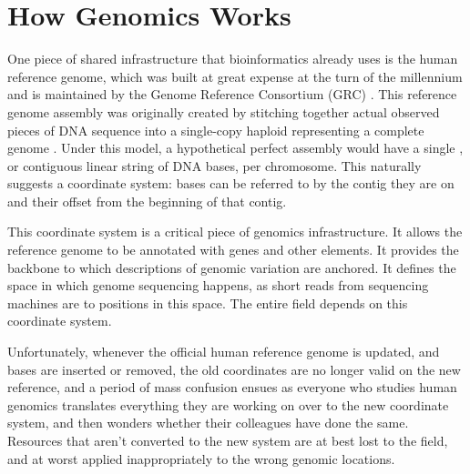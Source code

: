 \documentclass[11pt,proposal]{ucthesis}
\begin{document}
    
    
    
    
    

\section{How Genomics Works}

One piece of shared infrastructure that bioinformatics already uses is the human reference genome, which was built at great expense at the turn of the millennium and is maintained by the Genome Reference Consortium (GRC) \cite{church2011modernizing}. This reference genome assembly was originally created by stitching together actual observed pieces of DNA sequence into a single-copy haploid  representing a complete genome \cite{church2011modernizing}. Under this model, a hypothetical perfect assembly would have a single , or contiguous linear string of DNA bases, per chromosome. This naturally suggests a coordinate system: bases can be referred to by the contig they are on and their offset from the beginning of that contig.

This coordinate system is a critical piece of genomics infrastructure. It allows the reference genome to be annotated with genes and other elements. It provides the backbone to which descriptions of genomic variation are anchored. It defines the space in which genome sequencing happens, as short reads from sequencing machines are  to positions in this space. The entire field depends on this coordinate system.

Unfortunately, whenever the official human reference genome is updated, and bases are inserted or removed, the old coordinates are no longer valid on the new reference, and a period of mass confusion ensues as everyone who studies human genomics translates everything they are working on over to the new coordinate system, and then wonders whether their colleagues have done the same. Resources that aren't converted to the new system are at best lost to the field, and at worst applied inappropriately to the wrong genomic locations.
\end{document}
